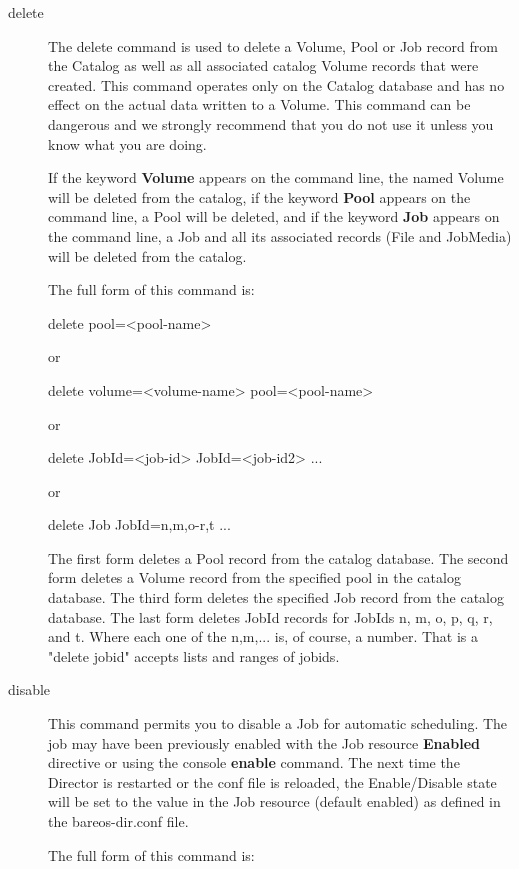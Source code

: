\begin{description}
\item [delete]
   The delete command is used to delete a Volume, Pool or Job record from
   the Catalog as well as all associated catalog Volume records that were
   created.  This command operates only on the Catalog database and has no
   effect on the actual data written to a Volume.  This command can be
   dangerous and we strongly recommend that you do not use it unless you
   know what you are doing.

   If the keyword {\bf Volume} appears on the command line, the named
   Volume will be deleted from the catalog, if the keyword {\bf Pool}
   appears on the command line, a Pool will be deleted, and if the keyword
   {\bf Job} appears on the command line, a Job and all its associated
   records (File and JobMedia) will be deleted from the catalog.

   The full form of this command is:

delete pool={\textless}pool-name{\textgreater}

   or

delete volume={\textless}volume-name{\textgreater} pool={\textless}pool-name{\textgreater}

   or

delete JobId={\textless}job-id{\textgreater} JobId={\textless}job-id2{\textgreater} ...

   or

delete Job JobId=n,m,o-r,t ...

   The first form deletes a Pool record from the catalog database.  The
   second form deletes a Volume record from the specified pool in the
   catalog database.  The third form deletes the specified Job record from
   the catalog database.  The last form deletes JobId records for JobIds
   n, m, o, p, q, r, and t.  Where each one of the n,m,...  is, of course, a
   number. That is a "delete jobid" accepts lists and ranges of
   jobids.

\item [disable]
  This command permits you to disable a Job for automatic scheduling.
  The job may have been previously enabled with the Job resource
  {\bf Enabled} directive or using the console {\bf enable} command.
  The next time the Director is restarted or the conf file is reloaded,
  the Enable/Disable state will be set to the value in the Job resource
  (default enabled) as defined in the bareos-dir.conf file.

   The full form of this command is:


\end{description}
